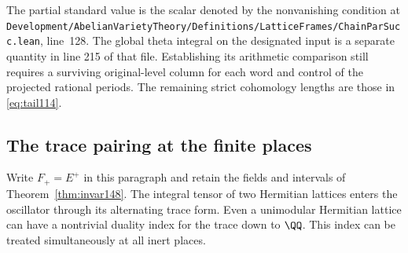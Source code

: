 \documentclass[a4paper,11pt]{article}
\theoremstyle{definition}
\theoremstyle{remark}
\newcommand{\srcloc}[2]{{\small\nolinkurl{#1.lean}}, line~#2}
\numberwithin{equation}{section}
\begin{document}
The partial standard value is the scalar denoted by the
nonvanishing condition at
\srcloc{Development/AbelianVarietyTheory/Definitions/LatticeFrames/ChainParSucc}{128}.
The global theta integral on the designated input is a separate
quantity in line 215 of that file. Establishing its arithmetic
comparison still requires a surviving original-level column
for each word and control of the projected rational periods.
The remaining strict cohomology lengths are those in
\eqref{eq:tail114}.

\subsection{The trace pairing at the finite places}\label{nav:VIII-20}
Write \(F_+=E^+\) in this paragraph and retain the fields
and intervals of Theorem~\ref{thm:invar148}. The integral
tensor of two Hermitian lattices enters the oscillator
through its alternating trace form. Even a unimodular
Hermitian lattice can have a nontrivial duality index for
the trace down to \(\QQ\). This index can be treated
simultaneously at all inert places.
\end{document}

